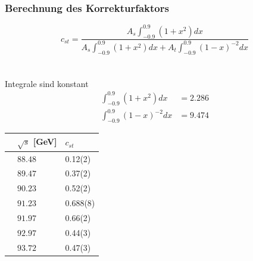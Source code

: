 \begin{frame}
	\frametitle{Berechnung des Korrekturfaktors}
	\begin{minipage}{0.7\linewidth}
		\begin{equation*}
		c_{st}=\frac{A_s\int_{-0.9}^{0.9}(1+x^2)dx}{A_s\int_{-0.9}^{0.9}(1+x^2)dx+A_t\int_{-0.9}^{0.9}(1-x)^{-2}dx}
		\end{equation*}\\
		\hfill\\
		\hspace{2cm} Integrale sind konstant
		\begin{align*}
		\int_{-0.9}^{0.9}(1+x^2)dx&=2.286\\
		\int_{-0.9}^{0.9}(1-x)^{-2}dx&=9.474
		\end{align*}
	\end{minipage}
	\begin{minipage}{0.28\linewidth}
		\begin{tabular}{@{}lll@{}}
			\toprule
			&$\sqrt{s}$ [GeV]&$c_{st}$\\
			\midrule
			&$88.48$&0.12(2)\\
			&$89.47$&0.37(2)\\
			&$90.23$&0.52(2)\\
			&$91.23$&0.688(8)\\
			&$91.97$&0.66(2)\\
			&$92.97$&0.44(3)\\
			&$93.72$&0.47(3)\\
			\bottomrule
		\end{tabular}
	\end{minipage}
\end{frame}

